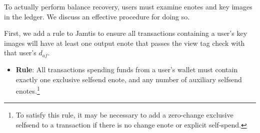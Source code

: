 To actually perform balance recovery, users must examine enotes and key images in the ledger. We discuss an effective procedure for doing so.

First, we add a rule to Jamtis to ensure all transactions containing a user's key images will have at least one output enote that passes the view tag check with that user's $d_{af}$.
\begin{itemize}
    \item \textbf{Rule}: All transactions spending funds from a user's wallet must contain exactly one exclusive selfsend enote, and any number of auxiliary selfsend enotes.\footnote{To satisfy this rule, it may be necessary to add a zero-change exclusive selfsend to a transaction if there is no change enote or explicit self-spend.}
\end{itemize}

